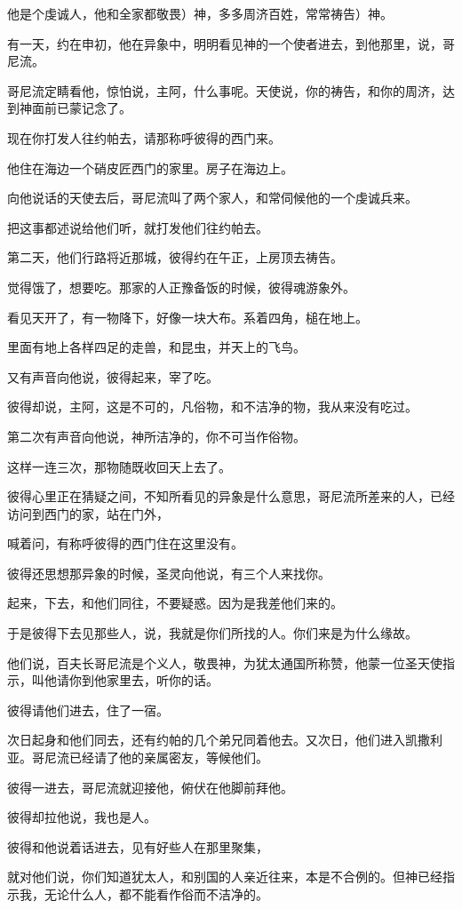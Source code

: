 \documentclass[12pt,oneside]{book}
\begin{document}
他是个虔诚人，他和全家都敬畏）神，多多周济百姓，常常祷告）神。

有一天，约在申初，他在异象中，明明看见神的一个使者进去，到他那里，说，哥尼流。

哥尼流定睛看他，惊怕说，主阿，什么事呢。天使说，你的祷告，和你的周济，达到神面前已蒙记念了。

现在你打发人往约帕去，请那称呼彼得的西门来。

他住在海边一个硝皮匠西门的家里。房子在海边上。

向他说话的天使去后，哥尼流叫了两个家人，和常伺候他的一个虔诚兵来。

把这事都述说给他们听，就打发他们往约帕去。

第二天，他们行路将近那城，彼得约在午正，上房顶去祷告。

觉得饿了，想要吃。那家的人正豫备饭的时候，彼得魂游象外。

看见天开了，有一物降下，好像一块大布。系着四角，槌在地上。

里面有地上各样四足的走兽，和昆虫，并天上的飞鸟。

又有声音向他说，彼得起来，宰了吃。

彼得却说，主阿，这是不可的，凡俗物，和不洁净的物，我从来没有吃过。

第二次有声音向他说，神所洁净的，你不可当作俗物。

这样一连三次，那物随既收回天上去了。

彼得心里正在猜疑之间，不知所看见的异象是什么意思，哥尼流所差来的人，已经访问到西门的家，站在门外，

喊着问，有称呼彼得的西门住在这里没有。

彼得还思想那异象的时候，圣灵向他说，有三个人来找你。

起来，下去，和他们同往，不要疑惑。因为是我差他们来的。

于是彼得下去见那些人，说，我就是你们所找的人。你们来是为什么缘故。

他们说，百夫长哥尼流是个义人，敬畏神，为犹太通国所称赞，他蒙一位圣天使指示，叫他请你到他家里去，听你的话。

彼得请他们进去，住了一宿。

次日起身和他们同去，还有约帕的几个弟兄同着他去。又次日，他们进入凯撒利亚。哥尼流已经请了他的亲属密友，等候他们。

彼得一进去，哥尼流就迎接他，俯伏在他脚前拜他。

彼得却拉他说，我也是人。

彼得和他说着话进去，见有好些人在那里聚集，

就对他们说，你们知道犹太人，和别国的人亲近往来，本是不合例的。但神已经指示我，无论什么人，都不能看作俗而不洁净的。
\end{document}
